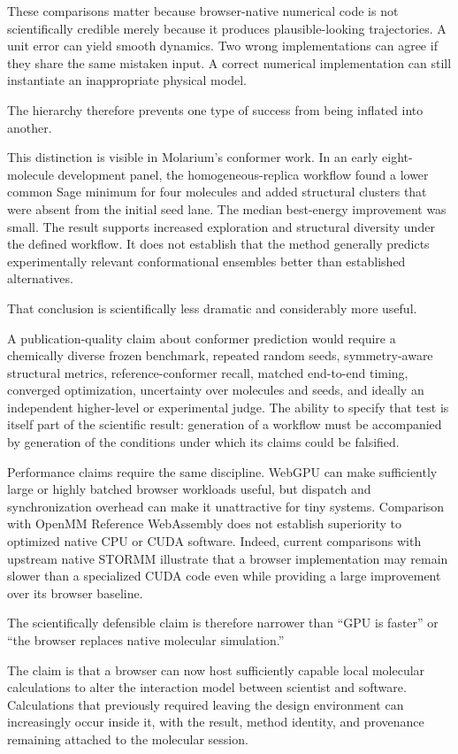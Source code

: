 \documentclass[11pt]{article}
\begin{document}
These comparisons matter because browser-native numerical code is not scientifically credible merely because it produces plausible-looking trajectories. A unit error can yield smooth dynamics. Two wrong implementations can agree if they share the same mistaken input. A correct numerical implementation can still instantiate an inappropriate physical model.

The hierarchy therefore prevents one type of success from being inflated into another.

This distinction is visible in Molarium's conformer work. In an early eight-molecule development panel, the homogeneous-replica workflow found a lower common Sage minimum for four molecules and added structural clusters that were absent from the initial seed lane. The median best-energy improvement was small. The result supports increased exploration and structural diversity under the defined workflow. It does not establish that the method generally predicts experimentally relevant conformational ensembles better than established alternatives.

That conclusion is scientifically less dramatic and considerably more useful.

A publication-quality claim about conformer prediction would require a chemically diverse frozen benchmark, repeated random seeds, symmetry-aware structural metrics, reference-conformer recall, matched end-to-end timing, converged optimization, uncertainty over molecules and seeds, and ideally an independent higher-level or experimental judge. The ability to specify that test is itself part of the scientific result: generation of a workflow must be accompanied by generation of the conditions under which its claims could be falsified.

Performance claims require the same discipline. WebGPU can make sufficiently large or highly batched browser workloads useful, but dispatch and synchronization overhead can make it unattractive for tiny systems. Comparison with OpenMM Reference WebAssembly does not establish superiority to optimized native CPU or CUDA software. Indeed, current comparisons with upstream native STORMM illustrate that a browser implementation may remain slower than a specialized CUDA code even while providing a large improvement over its browser baseline.

The scientifically defensible claim is therefore narrower than ``GPU is faster'' or ``the browser replaces native molecular simulation.''

The claim is that a browser can now host sufficiently capable local molecular calculations to alter the interaction model between scientist and software. Calculations that previously required leaving the design environment can increasingly occur inside it, with the result, method identity, and provenance remaining attached to the molecular session.
\end{document}
